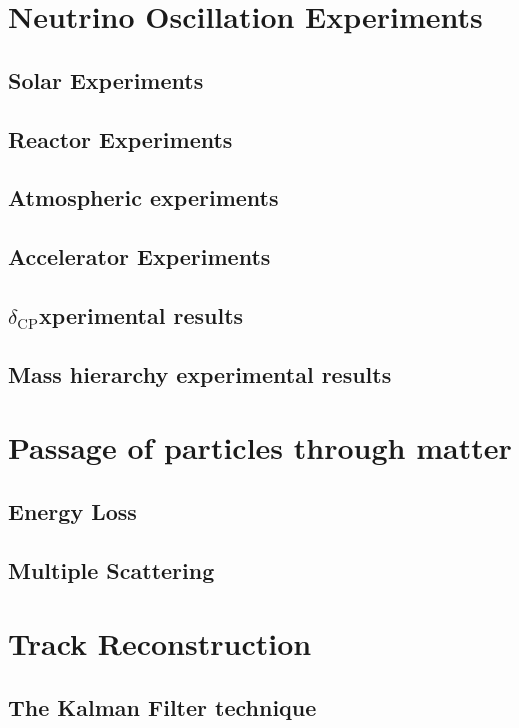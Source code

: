 \section{Neutrino Oscillation Experiments}
\subsection{Solar Experiments}
\subsection{Reactor Experiments}
\subsection{Atmospheric experiments}
\subsection{Accelerator Experiments}
\subsection{\texorpdfstring{$\delta_\textrm{CP}$} experimental results}
\subsection{Mass hierarchy experimental results}
\section{Passage of particles through matter}
\subsection{Energy Loss}
\subsection{Multiple Scattering}
\section{Track Reconstruction}
\subsection{The Kalman Filter technique}
